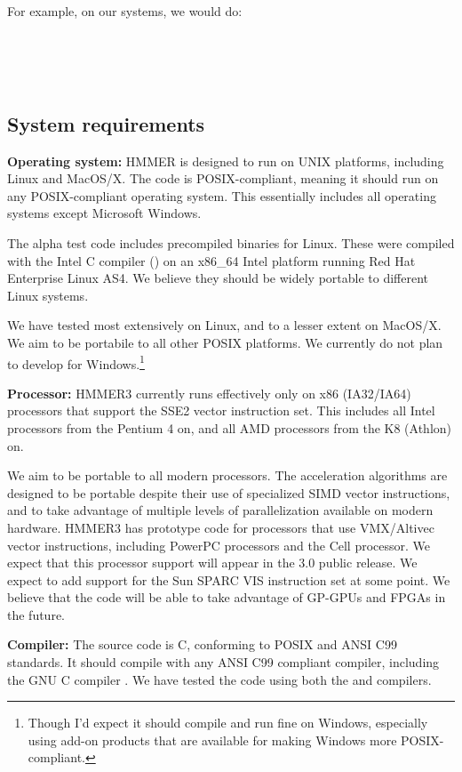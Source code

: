 For example, on our systems, we would do:

\\
\\
\\


\subsection{System requirements}

\textbf{Operating system:} HMMER is designed to run on UNIX platforms,
including Linux and MacOS/X. The code is POSIX-compliant, meaning it
should run on any POSIX-compliant operating system. This essentially
includes all operating systems except Microsoft Windows.  

The alpha test code includes precompiled binaries for Linux. These
were compiled with the Intel C compiler () on an x86\_64
Intel platform running Red Hat Enterprise Linux AS4. We believe they
should be widely portable to different Linux systems. 

We have tested most extensively on Linux, and to a lesser extent on
MacOS/X. We aim to be portabile to all other POSIX platforms.  We
currently do not plan to develop for Windows.\footnote{Though I'd
expect it should compile and run fine on Windows, especially using
add-on products that are available for making Windows more
POSIX-compliant.}

\textbf{Processor:} HMMER3 currently runs effectively only on x86
(IA32/IA64) processors that support the SSE2 vector instruction set.
This includes all Intel processors from the Pentium 4 on, and all AMD
processors from the K8 (Athlon) on.

We aim to be portable to all modern processors. The acceleration
algorithms are designed to be portable despite their use of
specialized SIMD vector instructions, and to take advantage of
multiple levels of parallelization available on modern hardware.
HMMER3 has prototype code for processors that use VMX/Altivec vector
instructions, including PowerPC processors and the Cell processor. We
expect that this processor support will appear in the 3.0 public
release. We expect to add support for the Sun SPARC VIS instruction
set at some point. We believe that the code will be able to take
advantage of GP-GPUs and FPGAs in the future.

\textbf{Compiler:} The source code is C, conforming to POSIX and ANSI
C99 standards. It should compile with any ANSI C99 compliant compiler,
including the GNU C compiler .  We have tested the code
using both the  and  compilers.

